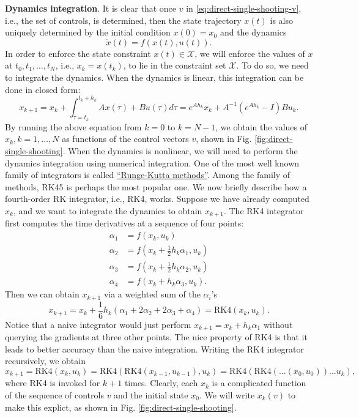 \documentclass[
]{book}
\theoremstyle{definition}
\theoremstyle{definition}
\theoremstyle{definition}
\theoremstyle{definition}
\theoremstyle{remark}
\begin{document}
\textbf{Dynamics integration}. It is clear that once \(v\) in \eqref{eq:direct-single-shooting-v}, i.e., the set of controls, is determined, then the state trajectory \(x(t)\) is also uniquely determined by the initial condition \(x(0) = x_0\) and the dynamics
\[
\dot{x}(t) = f(x(t),u(t)).
\]
In order to enforce the state constraint \(x(t) \in \mathcal{X}\), we will enforce the values of \(x\) at \(t_0,t_1,\dots,t_N\), i.e., \(x_k = x(t_k)\), to lie in the constraint set \(\mathcal{X}\). To do so, we need to integrate the dynamics. When the dynamics is linear, this integration can be done in closed form:
\[
x_{k+1} = x_k + \int_{\tau=t_k}^{t_k + h_k} A x(\tau) + B u(\tau) d\tau = e^{Ah_k} x_k + A^{-1}(e^{Ah_k} - I) B u_k.
\]
By running the above equation from \(k=0\) to \(k=N-1\), we obtain the values of \(x_k,k=1,\dots,N\) as functions of the control vectors \(v\), shown in Fig. \ref{fig:direct-single-shooting}. When the dynamics is nonlinear, we will need to perform the dynamics integration using numerical integration. One of the most well known family of integrators is called \href{https://en.wikipedia.org/wiki/Runge\%E2\%80\%93Kutta_methods\#Adaptive_Runge\%E2\%80\%93Kutta_methods}{``Runge-Kutta methods''}. Among the family of methods, RK45 is perhaps the most popular one. We now briefly describe how a fourth-order RK integrator, i.e., RK4, works. Suppose we have already computed \(x_k\), and we want to integrate the dynamics to obtain \(x_{k+1}\). The RK4 integrator first computes the time derivatives at a sequence of four points:
\begin{align}
\alpha_1 &= f(x_k, u_k) \\
\alpha_2 &= f\left( x_k + \frac{1}{2} h_k \alpha_1, u_k \right) \\
\alpha_3 &= f\left( x_k + \frac{1}{2} h_k \alpha_2, u_k \right) \\
\alpha_4 &= f\left( x_k + h_k \alpha_3, u_k \right).
\end{align}
Then we can obtain \(x_{k+1}\) via a weighted sum of the \(\alpha_i\)'s
\begin{equation}
x_{k+1} = x_k + \frac{1}{6} h_k \left( \alpha_1 + 2 \alpha_2 + 2 \alpha_3 + \alpha_4 \right) = \text{RK4}(x_k, u_k).
\label{eq:RK4-integrator}
\end{equation}
Notice that a naive integrator would just perform \(x_{k+1} = x_k + h_k \alpha_1\) without querying the gradients at three other points. The nice property of RK4 is that it leads to better accuracy than the naive integration. Writing the RK4 integrator recursively, we obtain
\[
x_{k+1} = \text{RK4}(x_k, u_k) = \text{RK4}(\text{RK4}(x_{k-1},u_{k-1}),u_k) = \text{RK4}(\text{RK4}(...(x_0,u_0))...u_k),
\]
where RK4 is invoked for \(k+1\) times. Clearly, each \(x_k\) is a complicated function of the sequence of controls \(v\) and the initial state \(x_0\). We will write \(x_k(v)\) to make this explict, as shown in Fig. \ref{fig:direct-single-shooting}.
\end{document}
